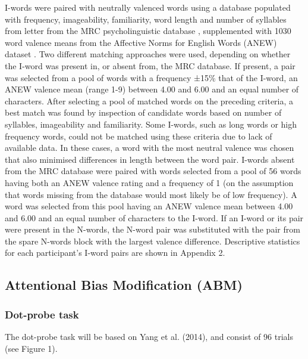\documentclass[man,a4paper,biblatex]{apa6}
\newcounter{Figure}
\begin{document}
I-words were paired with neutrally valenced words using a database
populated with frequency, imageability, familiarity, word length
and number of syllables from letter from the MRC psycholinguistic
database \parencite{wilson_mrc_1988}, supplemented with 1030 word
valence means from the Affective Norms for English Words (ANEW) dataset
\parencite{bradley_affective_1999}.  Two different matching approaches
were used, depending on whether the I-word was present in, or absent
from, the MRC database.  If present, a pair was selected from a pool of
words with a frequency ±15\% that of the I-word, an ANEW valence mean
(range 1-9) between 4.00 and 6.00 and an equal number of characters.
After selecting a pool of matched words on the preceding criteria, a
best match was found by inspection of candidate words based on number
of syllables, imageability and familiarity.  Some I-words, such as long
words or high frequency words, could not be matched using these criteria
due to lack of available data.  In these cases, a word with the most
neutral valence was chosen that also minimised differences in length
between the word pair.  I-words absent from the MRC database were paired
with words selected from a pool of 56 words having both an ANEW valence
rating and a frequency of 1 (on the assumption that words missing from
the database would most likely be of low frequency).  A word was selected
from this pool having an ANEW valence mean between 4.00 and 6.00 and
an equal number of characters to the I-word.  If an I-word or its pair
were present in the N-words, the N-word pair was substituted with the
pair from the spare N-words block with the largest valence difference.
Descriptive statistics for each participant's I-word pairs are shown in
Appendix 2.

\subsection{Attentional Bias Modification (ABM)}

\subsubsection{Dot-probe task}
The dot-probe task will be based on Yang et al. (2014), and consist of 96 trials (see Figure 1).
\end{document}
